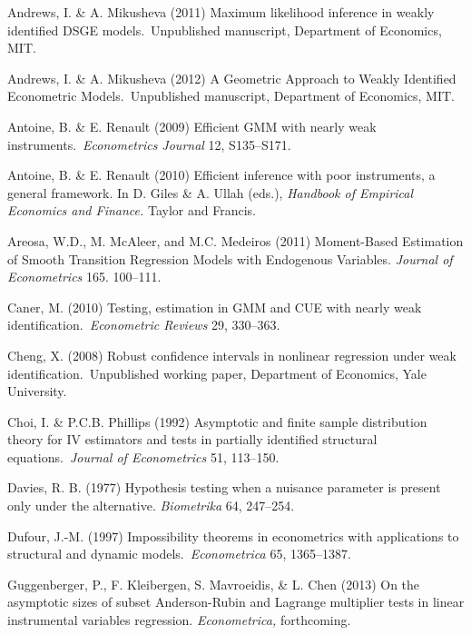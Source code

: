 \documentclass[12pt,thmsb,titlepage,final,oneside,letterpaper]{article}
\begin{document}
\begin{description}
\item Andrews, I. \& A. Mikusheva (2011) Maximum likelihood inference in
weakly identified DSGE models.\ Unpublished manuscript, Department of
Economics, MIT.

\item Andrews, I. \& A. Mikusheva (2012) A Geometric Approach to Weakly
Identified Econometric Models.\ Unpublished manuscript, Department of
Economics, MIT.

\item Antoine, B. \& E. Renault (2009) Efficient GMM with nearly weak
instruments.\ \emph{Econometrics Journal }12, S135--S171.

\item Antoine, B. \& E. Renault (2010) Efficient inference with poor
instruments, a general framework. In D. Giles \& A. Ullah (eds.), \emph{%
Handbook of Empirical Economics and Finance. }Taylor and Francis.

\item Areosa, W.D., M. McAleer, and M.C. Medeiros (2011) Moment-Based
Estimation of Smooth Transition Regression Models with Endogenous Variables. 
\emph{Journal of Econometrics }165. 100--111.

\item Caner, M. (2010) Testing, estimation in GMM and CUE with nearly weak
identification.\ \emph{Econometric Reviews} 29, 330--363.

\item Cheng, X. (2008) Robust confidence intervals in nonlinear regression
under weak identification.\ Unpublished working paper, Department of
Economics, Yale University.

\item Choi, I. \& P.C.B. Phillips (1992) Asymptotic and finite sample
distribution theory for IV estimators and tests in partially identified
structural equations.\ \emph{Journal of Econometrics} 51, 113--150.

\item Davies, R. B. (1977) Hypothesis testing when a nuisance parameter is
present only under the alternative. \emph{Biometrika} 64, 247--254.

\item Dufour, J.-M. (1997) Impossibility theorems in econometrics with
applications to structural and dynamic models.\ \emph{Econometrica} 65,
1365--1387.

\item Guggenberger, P., F. Kleibergen, S. Mavroeidis, \& L. Chen (2013) On
the asymptotic sizes of subset Anderson-Rubin and Lagrange multiplier tests
in linear instrumental variables regression. \emph{Econometrica,}
forthcoming.


\end{description}
\end{document}
